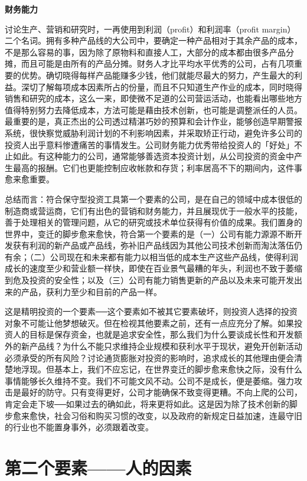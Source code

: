 \documentclass[UTF8,a4paper,zihao=-4,fontset = windows]{ctexart} %
\begin{document}
\textbf{财务能力}


讨论生产、营销和研究时，一再使用到利润（profit）和利润率（profit margin）二个名词。拥有多种产品线的大公司中，要确定一种产品相对于其余产品的成本，不是那么容易的事，因为除了原物料和直接人工，大部分的成本都由很多产品分摊，而且可能是由所有的产品分摊。财务人才比平均水平优秀的公司，占有几项重要的优势。确切晓得每样产品能赚多少钱，他们就能尽最大的努力，产生最大的利益。深切了解每项成本因素所占的份量，而且不只知道生产作业的成本，同时晓得销售和研究的成本，这么一来，即使微不足道的公司营运活动，也能看出哪些地方值得特别努力去降低成本，方法可能是藉由技术创新，也可能是调整派任的人员。最重要的是，真正杰出的公司透过精湛巧妙的预算和会计作业，能够创造早期警报系统，很快察觉威胁利润计划的不利影响因素，并采取矫正行动，避免许多公司的投资人出乎意料惨遭痛苦的事情发生。公司财务能力优秀带给投资人的「好处」不止如此。有这种能力的公司，通常能够善选资本投资计划，从公司投资的资金中产生最高的报酬。它们也更能控制应收帐款和存货；利率居高不下的期间内，这件事愈来愈重要。

总结而言：符合保守型投资工具第一个要素的公司，是在自己的领域中成本很低的制造商或营运商，它们有出色的营销和财务能力，并且展现优于一般水平的技能，善于处理相关的管理问题，从它的研究或技术单位获得有价值的成果。我们置身的世界中，变迁的脚步愈来愈快，符合第一个要素的是（一）公司有能力源源不断开发获有利润的新产品或产品线，弥补旧产品线因为其他公司技术创新而淘汰落伍仍有余；（二）公司现在和未来都有能力以相当低的成本生产这些产品线，使得利润成长的速度至少和营业额一样快，即使在百业景气最糟的年头，利润也不致于萎缩到危及投资的安全性；以及（三）公司有能力销售更新的产品以及未来可能开发出来的产品，获利力至少和目前的产品一样。

这是精明投资的一个要素──这个要素如不被其它要素破坏，则投资人选择的投资对象不可能让他梦想破灭。但在检视其他要素之前，还有一点应充分了解。如果投资人的目标是保存资金，也就是追求安全性，那么我们为什么要谈成长性和开发额外的新产品线？为什么不能只求维持企业规模和获利水平于现状，避免开创新活动必须承受的所有风险？讨论通货膨胀对投资的影响时，追求成长的其他理由便会清楚地浮现。但基本上，我们不应忘记，在世界变迁的脚步愈来愈快之际，没有什么事情能够长久维持不变。我们不可能文风不动。公司不是成长，便是萎缩。强力攻击是最好的防守。只有变得更好，公司才能确保不致变得更糟。不向上爬的公司，肯定会走下坡──如果过去的确如此，将来更将如此。这是因为除了技术创新的脚步愈来愈快，社会习俗和购买习惯的改变，以及政府的新规定日益加速，连最守旧的行业也不能置身事外，必须跟着改变。

\section{第二个要素——人的因素}
\end{document}
